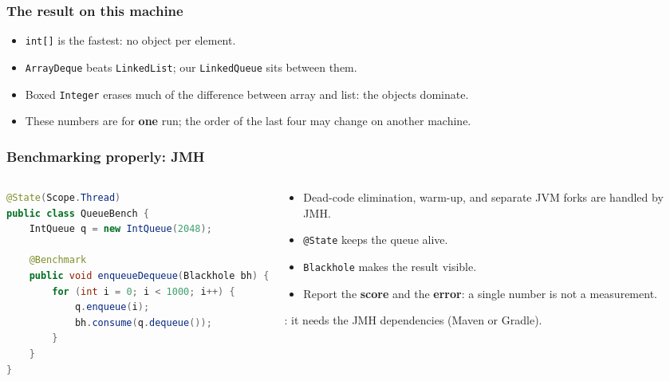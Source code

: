 \documentclass[aspectratio=169,10pt,compress]{beamer}
\begin{document}
\begin{frame}[t,fragile] \frametitle{The result on this machine}
  \vspace{0.4em}
  \begin{itemize}\small
    \item \texttt{int[]} is the fastest: no object per element.
    \item \texttt{ArrayDeque} beats \texttt{LinkedList}; our \texttt{LinkedQueue} sits between them.
    \item Boxed \texttt{Integer} erases much of the difference between array and list: the objects dominate.
    \item These numbers are for \textbf{one} run; the order of the last four may change on another machine.
  \end{itemize}
\end{frame}




\begin{frame}[t,fragile] \frametitle{Benchmarking properly: JMH}
  \begin{columns}[T]
    \begin{column}{0.56\textwidth}


\begin{lstlisting}[style=codesnippet, language=Java, basicstyle=\ttfamily\scriptsize]
@State(Scope.Thread)
public class QueueBench {
    IntQueue q = new IntQueue(2048);

    @Benchmark
    public void enqueueDequeue(Blackhole bh) {
        for (int i = 0; i < 1000; i++) {
            q.enqueue(i);
            bh.consume(q.dequeue());
        }
    }
}
\end{lstlisting}


    \end{column}
    \begin{column}{0.4\textwidth}
      \begin{itemize}\small
        \item Dead-code elimination, warm-up, and separate JVM forks are handled by JMH.
        \item \texttt{@State} keeps the queue alive.
        \item \texttt{Blackhole} makes the result visible.
        \item Report the \textbf{score} and the \textbf{error}: a single number is not a measurement.
      \end{itemize}
      \vspace{0.3em}
      : it needs the JMH dependencies (Maven or Gradle).
    \end{column}
  \end{columns}
\end{frame}
\end{document}
